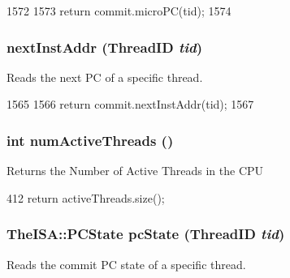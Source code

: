 \begin{DoxyCode}
1572 {
1573     return commit.microPC(tid);
1574 }
\end{DoxyCode}
\hypertarget{classFullO3CPU_af1caba1f04cf2802d742d1a16b961e79}{
\subsubsection[{nextInstAddr}]{ nextInstAddr ({\bf ThreadID} {\em tid})}}
\label{classFullO3CPU_af1caba1f04cf2802d742d1a16b961e79}
Reads the next PC of a specific thread. 


\begin{DoxyCode}
1565 {
1566     return commit.nextInstAddr(tid);
1567 }
\end{DoxyCode}
\hypertarget{classFullO3CPU_a2cf759e627e96ea55f7b91a72d437652}{
\subsubsection[{numActiveThreads}]{\setlength{\rightskip}{0pt plus 5cm}int numActiveThreads ()}}
\label{classFullO3CPU_a2cf759e627e96ea55f7b91a72d437652}
Returns the Number of Active Threads in the CPU 


\begin{DoxyCode}
412     { return activeThreads.size(); }
\end{DoxyCode}
\hypertarget{classFullO3CPU_af486ac7476906f63fc6696b3e76a411b}{
\subsubsection[{pcState}]{\setlength{\rightskip}{0pt plus 5cm}TheISA::PCState pcState ({\bf ThreadID} {\em tid})}}
\label{classFullO3CPU_af486ac7476906f63fc6696b3e76a411b}
Reads the commit PC state of a specific thread. 


